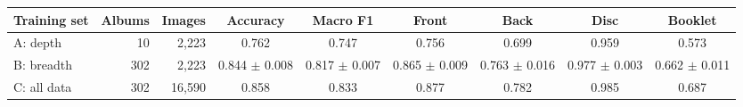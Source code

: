 \begin{tabular}{@{}lrrcccccc@{}}
\toprule
Training set & Albums & Images & Accuracy & Macro F1 & Front & Back & Disc & Booklet \\
\midrule
A: depth & 10 & 2,223 & 0.762 & 0.747 & 0.756 & 0.699 & 0.959 & 0.573 \\
B: breadth & 302 & 2,223 & 0.844 $\pm$ 0.008 & 0.817 $\pm$ 0.007 & 0.865 $\pm$ 0.009 & 0.763 $\pm$ 0.016 & 0.977 $\pm$ 0.003 & 0.662 $\pm$ 0.011 \\
C: all data & 302 & 16,590 & 0.858 & 0.833 & 0.877 & 0.782 & 0.985 & 0.687 \\
\bottomrule
\end{tabular}
